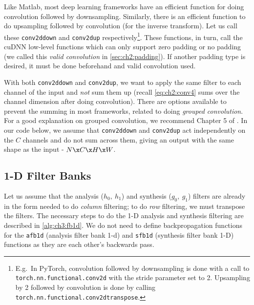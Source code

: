{%
\renewcommand{\_}{\textscale{.8}{\textunderscore}}
Like Matlab, most deep learning frameworks have an
efficient function for doing convolution followed by downsampling. Similarly,
there is an efficient function to do upsampling followed by convolution (for the
inverse transform). Let us call these \texttt{conv2d\_down} and
\texttt{conv2d\_up} respectively\footnote{E.g.\ In PyTorch, convolution followed
by downsampling is done with a call to \texttt{torch.nn.functional.conv2d} with
the stride parameter set to 2.  Upsampling by 2 followed by convolution is done
by calling \texttt{torch.nn.functional.conv2d\_transpose}.}.
These functions, in turn, call the cuDNN low-level functions which can only support
zero padding or no padding (we called this \emph{valid convolution} in
\autoref{sec:ch2:padding}). If another padding type is desired, it must be done beforehand and 
valid convolution used.

With both \texttt{conv2d\_down} and \texttt{conv2d\_up}, we want to apply the
same filter to each channel of the input and \emph{not} sum them up (recall
\eqref{eq:ch2:conv4} sums over the channel dimension after doing convolution).
There are options available to prevent the summing in most frameworks, related
to doing \emph{grouped convolution}. For a good explanation on grouped
convolution, we recommend Chapter 5 of \cite{Ioannou2017thesis}. In our code
below, we assume that \texttt{conv2d\_down} and \texttt{conv2d\_up} act
independently on the $C$ channels and do not sum across them, giving an
output with the same shape as the input - $N\x C\x H\x W$.
}

\subsection{1-D Filter Banks}
Let us assume that the analysis ($h_0,\ h_1$) and synthesis ($g_0,\ g_1$)
filters are already in the form needed to do \emph{column} filtering; to do
\emph{row} filtering, we must transpose the filters. The necessary
steps to do the 1-D analysis and synthesis filtering are described in
\autoref{alg:ch3:fb1d}. We do not need to define backpropagation functions for the
\texttt{afb1d} (analysis filter bank 1-d) and \texttt{sfb1d} (synthesis filter
bank 1-D) functions as they are each other's backwards pass.

